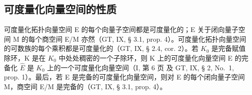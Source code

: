 \subsection{可度量化向量空间的性质}

可度量化拓扑向量空间 E 的每个向量子空间都是可度量化的；E 关于闭向量子空间 M 的每个商空间 E/M 亦然（GT, IX, § 3.1, prop. 4）。可度量化拓扑向量空间的可数族的每个乘积都是可度量化的（GT, IX, § 2.4, cor. 2）。若 \(K_{0}\) 是完备赋值除环，K 是在 \(K_{0}\) 中处处稠密的一个子除环，则 K 上的可度量化向量空间 E 的完备化 \(\hat{E}\) 是 \(K_{0}\) 上的一个可度量化向量空间（I, 第 6 页 及 GT, IX, § 2, No.~1, prop. 1）。最后，若 E 是完备的可度量化向量空间，则对 E 的每个闭向量子空间 M，商空间 E/M 是完备的（GT, IX, § 3.1, prop. 4）。

